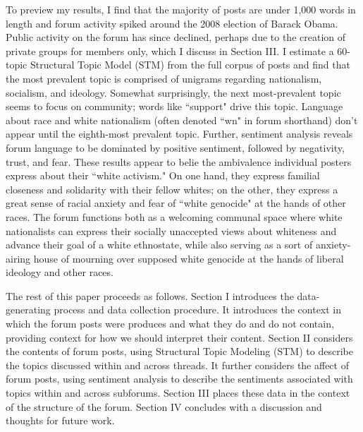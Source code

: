 \documentclass[12pt]{paper}
\begin{document}
To preview my results, I find that the majority of posts are under 1,000 words in length and forum activity spiked around the 2008 election of Barack Obama. Public activity on the forum has since declined, perhaps due to the creation of private groups for members only, which I discuss in Section III. I estimate a 60-topic Structural Topic Model (STM) from the full corpus of posts and find that the most prevalent topic is comprised of unigrams regarding nationalism, socialism, and ideology. Somewhat surprisingly, the next most-prevalent topic seems to focus on community; words like ``support" drive this topic. Language about race and white nationalism (often denoted ``wn" in forum shorthand) don't appear until the eighth-most prevalent topic. Further, sentiment analysis reveals forum language to be dominated by positive sentiment, followed by negativity, trust, and fear. These results appear to belie the ambivalence individual posters express about their ``white activism." On one hand, they express familial closeness and solidarity with their fellow whites; on the other, they express a great sense of racial anxiety and fear of ``white genocide" at the hands of other races. The forum functions both as a welcoming communal space where white nationalists can express their socially unaccepted views about whiteness and advance their goal of a white ethnostate, while also serving as a sort of anxiety-airing house of mourning over supposed white genocide at the hands of liberal ideology and other races.

The rest of this paper proceeds as follows. Section I introduces the data-generating process and data collection procedure. It introduces the context in which the forum posts were produces and what they do and do not contain, providing context for how we should interpret their content. Section II considers the contents of forum posts, using Structural Topic Modeling (STM) to describe the topics discussed within and across threads. It further considers the affect of forum posts, using sentiment analysis to describe the sentiments associated with topics within and across subforums. Section III places these data in the context of the structure of the forum. Section IV concludes with a discussion and thoughts for future work.
\end{document}
